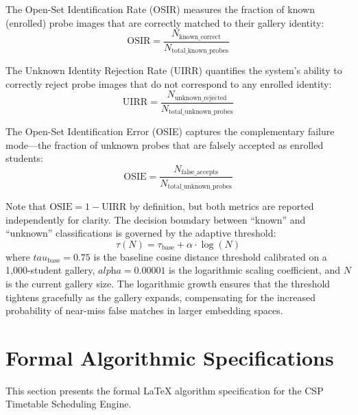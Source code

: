 \documentclass[12pt,a4paper,oneside]{report}
\begin{document}
The Open-Set Identification Rate (OSIR) measures the fraction of known (enrolled) probe images that are correctly matched to their gallery identity:
\begin{equation}
    \text{OSIR} = \frac{N_{\text{known\_correct}}}{N_{\text{total\_known\_probes}}}
    \label{eq:osir}
\end{equation}

The Unknown Identity Rejection Rate (UIRR) quantifies the system's ability to correctly reject probe images that do not correspond to any enrolled identity:
\begin{equation}
    \text{UIRR} = \frac{N_{\text{unknown\_rejected}}}{N_{\text{total\_unknown\_probes}}}
    \label{eq:uirr}
\end{equation}

The Open-Set Identification Error (OSIE) captures the complementary failure mode---the fraction of unknown probes that are falsely accepted as enrolled students:
\begin{equation}
    \text{OSIE} = \frac{N_{\text{false\_accepts}}}{N_{\text{total\_unknown\_probes}}}
    \label{eq:osie}
\end{equation}

Note that $\text{OSIE} = 1 - \text{UIRR}$ by definition, but both metrics are reported independently for clarity. The decision boundary between ``known'' and ``unknown'' classifications is governed by the adaptive threshold:
\begin{equation}
    \tau(N) = \tau_{\text{base}} + \alpha \cdot \log(N)
    \label{eq:adaptive_threshold}
\end{equation}
where $\textit{tau}_{\text{base}} = 0.75$ is the baseline cosine distance threshold calibrated on a 1,000-student gallery, $\textit{alpha} = 0.00001$ is the logarithmic scaling coefficient, and $N$ is the current gallery size. The logarithmic growth ensures that the threshold tightens gracefully as the gallery expands, compensating for the increased probability of near-miss false matches in larger embedding spaces.



\section{Formal Algorithmic Specifications}
This section presents the formal LaTeX algorithm specification for the CSP Timetable Scheduling Engine.
\end{document}
